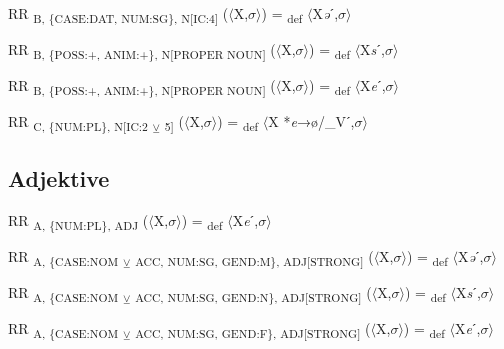 {\begin{exe}
 RR \textsubscript{B, \{CASE:DAT, NUM:SG\}, N[IC:4]} ($\langle$X,$\sigma $$\rangle$) = \textsubscript{def} $\langle$X\textit{ə}ˊ,$\sigma $$\rangle$
\end{exe}

\begin{exe}
 RR \textsubscript{B, \{POSS:+, ANIM:+\}, N[PROPER NOUN]} ($\langle$X,$\sigma $$\rangle$) = \textsubscript{def} $\langle$X\textit{s}ˊ,$\sigma $$\rangle$
\end{exe}

\begin{exe}
 RR \textsubscript{B, \{POSS:+, ANIM:+\}, N[PROPER NOUN]} ($\langle$X,$\sigma $$\rangle$) = \textsubscript{def} $\langle$X\textit{e}ˊ,$\sigma $$\rangle$
\end{exe}

\begin{exe}
 RR \textsubscript{C, \{NUM:PL\}, N[IC:2} \textsubscript{${\veebar}$}\textsubscript{ 5]} ($\langle$X,$\sigma $$\rangle$) = \textsubscript{def} $\langle$X *\textit{e}→ø/\_Vˊ,$\sigma $$\rangle$
\end{exe}

\subsection{Adjektive}

\begin{exe}
 RR \textsubscript{A, \{NUM:PL\}, ADJ} ($\langle$X,$\sigma $$\rangle$) = \textsubscript{def} $\langle$X\textit{e}ˊ,$\sigma $$\rangle$
\end{exe}

\begin{exe}
 RR \textsubscript{A, \{CASE:NOM} \textsubscript{${\veebar}$}\textsubscript{ ACC, NUM:SG, GEND:M\}, ADJ[STRONG]} ($\langle$X,$\sigma $$\rangle$) = \textsubscript{def} $\langle$X\textit{ə}ˊ,$\sigma $$\rangle$
\end{exe}

\begin{exe}
 RR \textsubscript{A, \{CASE:NOM} \textsubscript{${\veebar}$}\textsubscript{ ACC, NUM:SG, GEND:N\}, ADJ[STRONG]} ($\langle$X,$\sigma $$\rangle$) = \textsubscript{def} $\langle$X\textit{s}ˊ,$\sigma $$\rangle$
\end{exe}

\begin{exe}
 RR \textsubscript{A, \{CASE:NOM} \textsubscript{${\veebar}$}\textsubscript{ ACC, NUM:SG, GEND:F\}, ADJ[STRONG]} ($\langle$X,$\sigma $$\rangle$) = \textsubscript{def} $\langle$X\textit{e}ˊ,$\sigma $$\rangle$
\end{exe}

}
